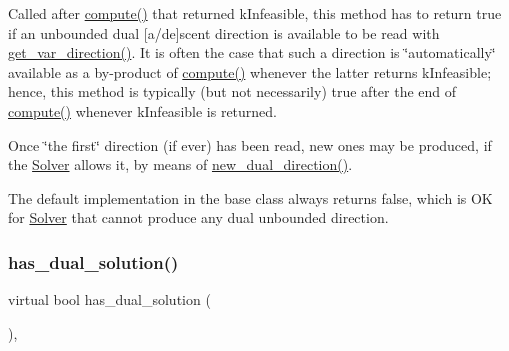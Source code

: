 Called after \mbox{\hyperlink{class_s_m_spp__di__unipi__it_1_1_solver_a504d4e3e174c7a518cc66156a8a45ce5}{compute()}} that returned k\+Infeasible, this method has to return true if an unbounded dual \mbox{[}a/de\mbox{]}scent direction is available to be read with \mbox{\hyperlink{class_s_m_spp__di__unipi__it_1_1_solver_a4bc119810c0c2ee3ba0c48183f50aaf4}{get\+\_\+var\+\_\+direction()}}. It is often the case that such a direction is \char`\"{}automatically\char`\"{} available as a by-\/product of \mbox{\hyperlink{class_s_m_spp__di__unipi__it_1_1_solver_a504d4e3e174c7a518cc66156a8a45ce5}{compute()}} whenever the latter returns k\+Infeasible; hence, this method is typically (but not necessarily) true after the end of \mbox{\hyperlink{class_s_m_spp__di__unipi__it_1_1_solver_a504d4e3e174c7a518cc66156a8a45ce5}{compute()}} whenever k\+Infeasible is returned.

Once \char`\"{}the first\char`\"{} direction (if ever) has been read, new ones may be produced, if the \mbox{\hyperlink{class_s_m_spp__di__unipi__it_1_1_solver}{Solver}} allows it, by means of \mbox{\hyperlink{class_s_m_spp__di__unipi__it_1_1_c_d_a_solver_ad83925e362d49bbe570a881791e45ea0}{new\+\_\+dual\+\_\+direction()}}.

The default implementation in the base class always returns false, which is OK for \mbox{\hyperlink{class_s_m_spp__di__unipi__it_1_1_solver}{Solver}} that cannot produce any dual unbounded direction. \mbox{\label{class_s_m_spp__di__unipi__it_1_1_c_d_a_solver_a26970b0da7f4f7b56bcfc890983d9a40}} 
\subsubsection{\texorpdfstring{has\+\_\+dual\+\_\+solution()}{has\_dual\_solution()}}
{\footnotesize\ttfamily virtual bool has\+\_\+dual\+\_\+solution (\begin{DoxyParamCaption}\item[{void}]{ }\end{DoxyParamCaption})\hspace{0.3cm}{\ttfamily [inline]}, {\ttfamily [virtual]}}



